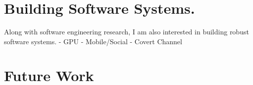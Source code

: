 \documentclass[a4paper, 11pt]{article}
\begin{document}
\begin{small}
\section*{\large Building Software Systems.}

Along with software engineering research, I am also interested in building 
robust software systems.
- GPU
- Mobile/Social
- Covert Channel


\section*{Future Work}


\begin{comment}

Furthermore, once a feature is introduced in one of the BSDs, it suffers significant delay, on
average three releases, to propagate to other BSDs.


In summary, this study shows that the upkeep effort of maintaining forked variant products is
significant and calls for new techniques to automate porting. The findings of this study was
published in ACM SIGSOFT International Symposium on the Foundations of Software Engineering
(FSE 2012)~\cite{Ray2012}.



\end{comment}
\end{small}
\end{document}
